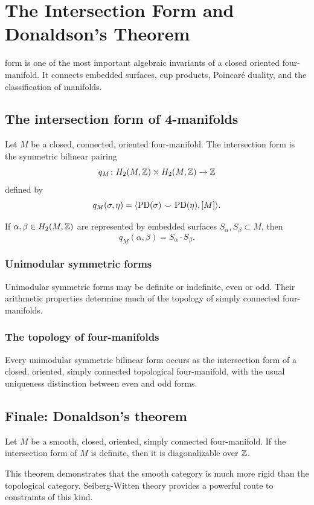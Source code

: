 \chapter{The Intersection Form and Donaldson's Theorem}

 form is one of the most important algebraic invariants of a closed oriented four-manifold. It connects embedded surfaces, cup products, Poincaré duality, and the classification of manifolds.

\section{The intersection form of 4-manifolds}
\begin{definition}
Let $M$ be a closed, connected, oriented four-manifold. The intersection form is the symmetric bilinear pairing
\[
  q_M\colon H_2(M,\mathbb{Z})\times H_2(M,\mathbb{Z})\to \mathbb{Z}
\]
defined by
\[
  q_M(\sigma,\eta)=\langle \operatorname{PD}(\sigma)\smile \operatorname{PD}(\eta),[M]\rangle.
\]
\end{definition}

\begin{proposition}
If $\alpha,\beta\in H_2(M,\mathbb{Z})$ are represented by embedded surfaces $S_\alpha,S_\beta\subset M$, then
\[
  q_M(\alpha,\beta)=S_\alpha\cdot S_\beta.
\]
\end{proposition}

\subsection{Unimodular symmetric forms}
Unimodular symmetric forms may be definite or indefinite, even or odd. Their arithmetic properties determine much of the topology of simply connected four-manifolds.

\subsection{The topology of four-manifolds}
\begin{theorem}[Freedman]
Every unimodular symmetric bilinear form occurs as the intersection form of a closed, oriented, simply connected topological four-manifold, with the usual uniqueness distinction between even and odd forms.
\end{theorem}

\section{Finale: Donaldson's theorem}
\begin{theorem}[Donaldson]
Let $M$ be a smooth, closed, oriented, simply connected four-manifold. If the intersection form of $M$ is definite, then it is diagonalizable over $\mathbb{Z}$.
\end{theorem}

This theorem demonstrates that the smooth category is much more rigid than the topological category. Seiberg-Witten theory provides a powerful route to constraints of this kind.
